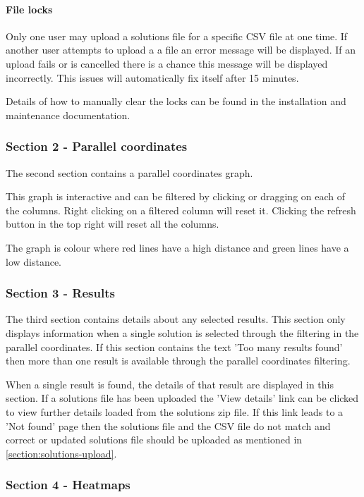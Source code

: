 \paragraph{File locks}  Only one user may upload a solutions file for a specific CSV file at one time.  If another user attempts to upload a a file an error message will be displayed.  If an upload fails or is cancelled there is a chance this message will be displayed incorrectly.  This issues will automatically fix itself after 15 minutes.

Details of how to manually clear the locks can be found in the installation and maintenance documentation.

\subsubsection{Section 2 - Parallel coordinates}

The second section contains a parallel coordinates graph.

This graph is interactive and can be filtered by clicking or dragging on each of the columns.  Right clicking on a filtered column will reset it.  Clicking the refresh button in the top right will reset all the columns.

The graph is colour where red lines have a high distance and green lines have a low distance.

\subsubsection{Section 3 - Results}

The third section contains details about any selected results.  This section only displays information when a single solution is selected through the filtering in the parallel coordinates.  If this section contains the text 'Too many results found' then more than one result is available through the parallel coordinates filtering.

When a single result is found, the details of that result are displayed in this section.  If a solutions file has been uploaded the 'View details' link can be clicked to view further details loaded from the solutions zip file.  If this link leads to a 'Not found' page then the solutions file and the CSV file do not match and correct or updated solutions file should be uploaded as mentioned in \ref{section:solutions-upload}.

\subsubsection{Section 4 - Heatmaps}


